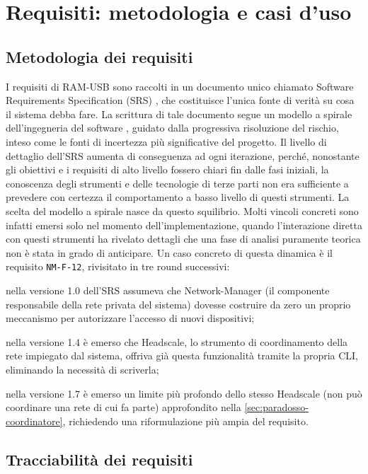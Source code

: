 \chapter{Requisiti: metodologia e casi d'uso}
\label{chap:requisiti}

\section{Metodologia dei requisiti}

I requisiti di RAM-USB sono raccolti in un documento unico chiamato Software Requirements
Specification (SRS) \cite{ramusb-srs},
che costituisce l'unica fonte di verità su cosa il sistema debba fare.
La scrittura di tale documento segue un modello a spirale dell'ingegneria del software \cite{Boehm88},
guidato dalla progressiva risoluzione del rischio, inteso come le fonti di incertezza più significative
del progetto.  
Il livello di dettaglio dell'SRS aumenta di conseguenza ad ogni iterazione, perché, nonostante 
gli obiettivi e i requisiti di alto livello fossero chiari fin dalle fasi iniziali, la conoscenza degli 
strumenti e delle tecnologie di terze parti non era sufficiente a prevedere con certezza il comportamento 
a basso livello di questi strumenti. La scelta del modello a spirale nasce da questo squilibrio.
Molti vincoli concreti sono infatti emersi solo nel momento dell'implementazione, quando l'interazione 
diretta con questi strumenti ha rivelato dettagli che una fase di analisi puramente teorica non è stata
in grado di anticipare.
Un caso concreto di questa dinamica è il requisito \texttt{NM-F-12}, rivisitato in tre round successivi:  

nella versione 1.0 dell'SRS \cite{ramusb-commit-nm-f-12-v1} assumeva che Network-Manager (il
componente responsabile della rete privata del sistema) dovesse costruire da zero un proprio meccanismo
per autorizzare l'accesso di nuovi dispositivi;

nella versione 1.4 \cite{ramusb-commit-nm-f-12-cli} è emerso che Headscale, lo strumento di
coordinamento della rete impiegato dal sistema, offriva già questa funzionalità tramite la propria
CLI, eliminando la necessità di scriverla;

nella versione 1.7 \cite{ramusb-commit-nm-f-12-14-rework} è emerso un limite più profondo dello stesso
Headscale (non può coordinare una rete di cui fa parte) approfondito nella
\autoref{sec:paradosso-coordinatore}, richiedendo una riformulazione più ampia del requisito.

\section{Tracciabilità dei requisiti}


